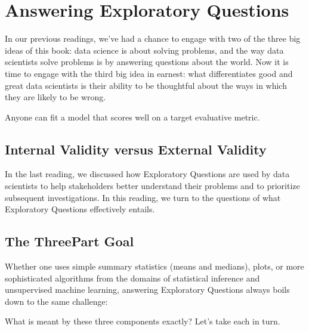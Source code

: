 \documentclass[letterpaper,10pt,english]{jupyterBook}
\begin{document}
\chapter{Answering Exploratory Questions}
\label{\detokenize{30_questions/15_answering_exploratory_questions:answering-exploratory-questions}}\label{\detokenize{30_questions/15_answering_exploratory_questions::doc}}
\sphinxAtStartPar
In our previous readings, we’ve had a chance to engage with two of the three big ideas of this book: data science is about solving problems, and the way data scientists solve problems is by answering questions about the world. Now it is time to engage with the third big idea in earnest: what differentiates good and great data scientists is their ability to be thoughtful about the ways in which they are likely to be wrong.

\sphinxAtStartPar
Anyone can fit a model that scores well on a target evaluative metric.


\section{Internal Validity versus External Validity}
\label{\detokenize{30_questions/15_answering_exploratory_questions:internal-validity-versus-external-validity}}
\sphinxAtStartPar
In the last reading, we discussed how Exploratory Questions are used by data scientists to help stakeholders better understand their problems and to prioritize subsequent investigations. In this reading, we turn to the questions of what  Exploratory Questions effectively entails.


\section{The Three\sphinxhyphen{}Part Goal}
\label{\detokenize{30_questions/15_answering_exploratory_questions:the-three-part-goal}}
\sphinxAtStartPar
Whether one uses simple summary statistics (means and medians), plots, or more sophisticated algorithms from the domains of statistical inference and unsupervised machine learning, answering Exploratory Questions always boils down to the same challenge:

\sphinxAtStartPar
{}

\sphinxAtStartPar
What is meant by these three components exactly? Let’s take each in turn.
\end{document}

